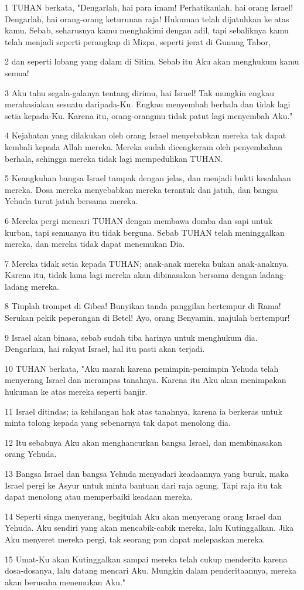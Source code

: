 \par 1 TUHAN berkata, "Dengarlah, hai para imam! Perhatikanlah, hai orang Israel! Dengarlah, hai orang-orang keturunan raja! Hukuman telah dijatuhkan ke atas kamu. Sebab, seharusnya kamu menghakimi dengan adil, tapi sebaliknya kamu telah menjadi seperti perangkap di Mizpa, seperti jerat di Gunung Tabor,
\par 2 dan seperti lobang yang dalam di Sitim. Sebab itu Aku akan menghukum kamu semua!
\par 3 Aku tahu segala-galanya tentang dirimu, hai Israel! Tak mungkin engkau merahasiakan sesuatu daripada-Ku. Engkau menyembah berhala dan tidak lagi setia kepada-Ku. Karena itu, orang-orangmu tidak patut lagi menyembah Aku."
\par 4 Kejahatan yang dilakukan oleh orang Israel menyebabkan mereka tak dapat kembali kepada Allah mereka. Mereka sudah dicengkeram oleh penyembahan berhala, sehingga mereka tidak lagi mempedulikan TUHAN.
\par 5 Keangkuhan bangsa Israel tampak dengan jelas, dan menjadi bukti kesalahan mereka. Dosa mereka menyebabkan mereka terantuk dan jatuh, dan bangsa Yehuda turut jatuh bersama mereka.
\par 6 Mereka pergi mencari TUHAN dengan membawa domba dan sapi untuk kurban, tapi semuanya itu tidak berguna. Sebab TUHAN telah meninggalkan mereka, dan mereka tidak dapat menemukan Dia.
\par 7 Mereka tidak setia kepada TUHAN; anak-anak mereka bukan anak-anaknya. Karena itu, tidak lama lagi mereka akan dibinasakan bersama dengan ladang-ladang mereka.
\par 8 Tiuplah trompet di Gibea! Bunyikan tanda panggilan bertempur di Rama! Serukan pekik peperangan di Betel! Ayo, orang Benyamin, majulah bertempur!
\par 9 Israel akan binasa, sebab sudah tiba harinya untuk menghukum dia. Dengarkan, hai rakyat Israel, hal itu pasti akan terjadi.
\par 10 TUHAN berkata, "Aku marah karena pemimpin-pemimpin Yehuda telah menyerang Israel dan merampas tanahnya. Karena itu Aku akan menimpakan hukuman ke atas mereka seperti banjir.
\par 11 Israel ditindas; ia kehilangan hak atas tanahnya, karena ia berkeras untuk minta tolong kepada yang sebenarnya tak dapat menolong dia.
\par 12 Itu sebabnya Aku akan menghancurkan bangsa Israel, dan membinasakan orang Yehuda.
\par 13 Bangsa Israel dan bangsa Yehuda menyadari keadaannya yang buruk, maka Israel pergi ke Asyur untuk minta bantuan dari raja agung. Tapi raja itu tak dapat menolong atau memperbaiki keadaan mereka.
\par 14 Seperti singa menyerang, begitulah Aku akan menyerang orang Israel dan Yehuda. Aku sendiri yang akan mencabik-cabik mereka, lalu Kutinggalkan. Jika Aku menyeret mereka pergi, tak seorang pun dapat melepaskan mereka.
\par 15 Umat-Ku akan Kutinggalkan sampai mereka telah cukup menderita karena dosa-dosanya, lalu datang mencari Aku. Mungkin dalam penderitaannya, mereka akan berusaha menemukan Aku."

